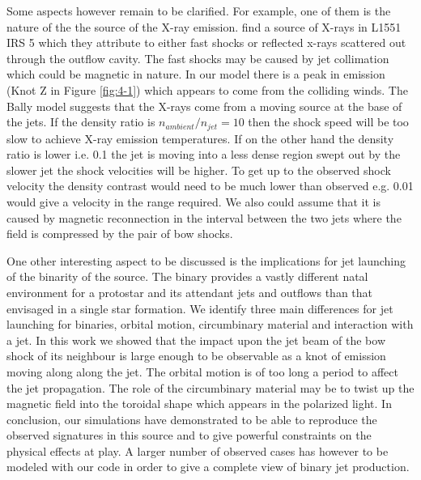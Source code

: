 \documentclass{aa}
\begin{document}
Some aspects however remain to be clarified. For example, 
one of them is the nature of the the source of the X-ray emission.
\citet{2003ApJ...584..843B} find a source of X-rays in L1551 IRS 5 
which they attribute to either fast shocks or reflected x-rays 
scattered out through the outflow cavity.
The fast shocks may be caused by jet collimation 
which could be magnetic in nature. 
In our model there is a peak in emission (Knot Z in Figure \ref{fig:4-1}) which
appears to come from the colliding winds.
The Bally model suggests that the X-rays come from a moving source at the base
of the jets. If the density ratio is $n_{ambient}/n_{jet}=10$ then the shock speed
will be too slow to achieve X-ray emission temperatures. If on
the other hand the density ratio is lower i.e. 0.1 the jet is moving into a less
dense region swept out by the slower jet the shock velocities will be higher. To get up to the observed shock velocity the density contrast would
need to be much lower than observed e.g. 0.01 would give a velocity in the range required.
We also could assume that it is caused by magnetic reconnection in the
interval between the two jets where the field is compressed by the pair of bow
shocks. 

One other interesting aspect to be discussed is the
implications for jet launching of the binarity of the source. 
The binary provides a vastly different natal environment for a protostar and its
attendant jets and outflows than that envisaged in a single star formation.
We identify three main differences for jet launching for binaries, orbital motion, circumbinary material and interaction with a jet.
In this work we showed that the impact upon the jet beam of the bow shock of its
neighbour is large enough to be observable as a knot of emission moving along
along the jet. The orbital motion is of too long a period to affect the jet
propagation. The role of the circumbinary material may be to twist up the magnetic field into the toroidal shape which appears in the polarized light.
In conclusion, our simulations have demonstrated to be able to reproduce 
the observed signatures in this source and to give powerful constraints 
on the physical effects at play. 
A larger number of observed cases has however to be modeled with our code 
in order to give a complete view of binary jet production. 
\end{document}
